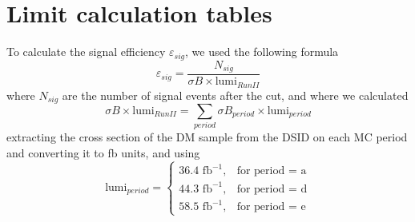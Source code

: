 \documentclass[12pt, a4paper]{book}
\begin{document}
\label{chap:Limit_Tabs}
\chapter{Limit calculation tables}
To calculate the signal efficiency $\varepsilon_{sig}$, we used the following formula
$$
\varepsilon_{sig}=\frac{N_{sig}}{\sigma B \times \text{lumi}_{RunII}}
$$
where $N_{sig}$ are the number of signal events after the cut, and where we calculated 
$$
\sigma B \times \text{lumi}_{RunII} = \sum_{period}\sigma B_{period} \times \text{lumi}_{period}
$$
extracting the cross section of the DM sample from the DSID on each MC period and converting it to fb units, and using
$$
\text{lumi}_{period} = \begin{cases}
               36.4\text{ fb}^{-1},& \text{for period = a}\\
               44.3\text{ fb}^{-1},& \text{for  period = d}\\
               58.5\text{ fb}^{-1},& \text{for  period = e}
               \end{cases}
$$
\end{document}
